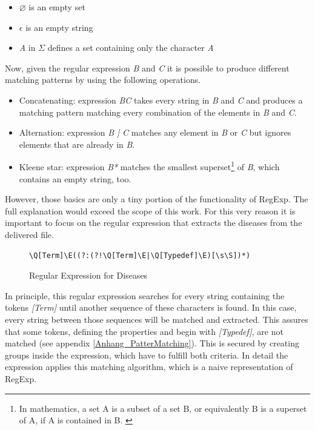 \begin{itemize}
\item{$\varnothing$ is an empty set}
\item{$\epsilon$ is an empty string}
\item{\textit{A} in $\Sigma$ defines a set containing only the character \textit{A}}
\end{itemize}

Now, given the regular expression \textit{B} and \textit{C} it is possible to produce different matching patterns by using the following operations. 

\begin{itemize}
\item{Concatenating: expression \textit{BC} takes every string in \textit{B} and \textit{C} and produces a matching pattern matching every combination of the elements in \textit{B} and \textit{C}.}
\item{Alternation: expression \textit{B | C} matches any element in \textit{B} or \textit{C} but ignores elements that are already in \textit{B}.}
\item{Kleene star: expression \textit{B*} matches the smallest superset\footnote{In mathematics, a set A is a subset of a set B, or equivalently B is a superset of A, if A is contained in B. \citep{Hopcroft2007}} of \textit{B}, which contains an empty string, too.}
\end{itemize}

However, those basics are only a tiny portion of the functionality of \ac{RegExp}. The full explanation would exceed the scope of this work. For this very reason it is important to focus on the regular expression that extracts the diseases from the delivered file.\\

\begin{figure}[H]
\centering
\begin{lstlisting}[xleftmargin=0.24\textwidth, xrightmargin=0.22\textwidth]
\Q[Term]\E((?:(?!\Q[Term]\E|\Q[Typedef]\E)[\s\S])*)
\end{lstlisting}
\caption{Regular Expression for Diseases}
\end{figure}

In principle, this regular expression searches for every string containing the tokens \textit{[Term]} until another sequence of these characters is found. In this case, every string between those sequences will be matched and extracted. This assures that some tokens, defining the properties and begin with \textit{[Typedef]}, are not matched (see appendix \ref{Anhang_PatterMatching}). This is secured by creating groups inside the expression, which have to fulfill both criteria. In detail the expression applies this matching algorithm, which is a naive representation of \ac{RegExp}.

